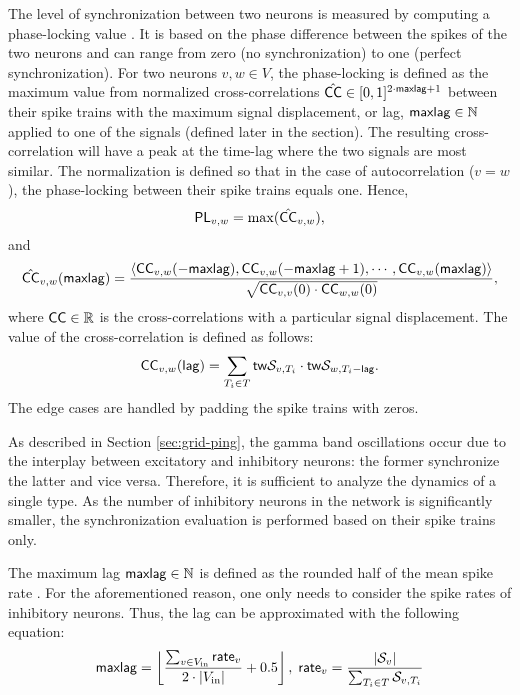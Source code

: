 The level of synchronization between two neurons is measured by computing a phase-locking value \cite{Lowet2015}. 
It is based on the phase difference between the spikes of the two neurons and can range from zero (no synchronization) to one (perfect synchronization).
For two neurons $v, w \in V$, the phase-locking 
is defined as the maximum value from normalized cross-correlations $\hat{\mathsf{CC}} \in [0, 1]^{2 \cdot \mathsf{maxlag} + 1}$ between their spike trains with the maximum signal displacement, or lag, $\mathsf{maxlag} \in \mathbb{N}$ applied to one of the signals (defined later in the section). 
The resulting cross-correlation will have a peak at the time-lag where the two signals are most similar.
The normalization is defined so that in the case of autocorrelation ($v = w$), the phase-locking between their spike trains equals one. Hence,
\begin{equation}
    \mathsf{PL}_{v, w} = 
    \max(\hat{\mathsf{CC}}_{v, w}),
\end{equation}
and
\begin{equation}
    \hat{\mathsf{CC}}_{v, w}(\mathsf{maxlag}) = 
    \frac{
        \left<
            \mathsf{CC}_{v, w}(-\mathsf{maxlag}),
            \mathsf{CC}_{v, w}(-\mathsf{maxlag} + 1),
            \cdots,
            \mathsf{CC}_{v, w}(\mathsf{maxlag})
        \right>
    }{
        \sqrt{\mathsf{CC}_{v, v}(0) \cdot \mathsf{CC}_{w, w}(0)}
    },
\end{equation}
where $\mathsf{CC} \in \mathbb{R}$ is the cross-correlations with a particular signal displacement. The value of the cross-correlation is defined as follows:
\begin{equation}
    \mathsf{CC}_{v, w}(\mathsf{lag}) = 
    \sum_{T_i \in T} 
    \mathsf{tw}\mathcal{S}_{v, T_i} \cdot \mathsf{tw}\mathcal{S}_{w, T_i-\mathsf{lag}}.
\end{equation}
The edge cases are handled by padding the spike trains with zeros. 

As described in Section \ref{sec:grid-ping}, the gamma band oscillations occur due to the interplay between excitatory and inhibitory neurons: the former synchronize the latter and vice versa. Therefore, it is sufficient to analyze the dynamics of a single type. As the number of inhibitory neurons in the network is significantly smaller, the synchronization evaluation is performed based on their spike trains only. 

The maximum lag $\mathsf{maxlag} \in \mathbb{N}$ is defined as the rounded half of the mean spike rate \cite{Lowet2015}. For the aforementioned reason, one only needs to consider the spike rates of inhibitory neurons. Thus, the lag can be approximated with the following equation:
\begin{equation}
    \mathsf{maxlag} = \left\lfloor 
        \frac{
            \sum_{v \in V_{\mathrm{in}}} \mathsf{rate}_v
        }{
            2 \cdot |V_{\mathrm{in}}|
        }
        + 0.5
     \right\rfloor, 
    \;
    \mathsf{rate}_v = \frac{
        |\mathcal{S}_v|
    }{
        \sum_{T_i \in T} \mathcal{S}_{v, T_i}
    }
\end{equation}

